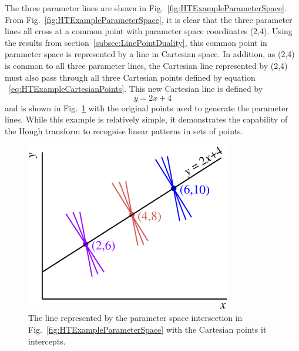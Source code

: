 The three parameter lines are shown in Fig.~\ref{fig:HTExampleParameterSpace}.  From Fig.~\ref{fig:HTExampleParameterSpace}, it is clear that the three parameter lines all cross at a common point with parameter space coordinates (2,4).  Using the results from section~\ref{subsec:LinePointDuality}, this common point in parameter space is represented by a line in Cartesian space.  In addition, as (2,4) is common to all three parameter lines, the Cartesian line represented by (2,4) must also pass through all three Cartesian points defined by equation ~\ref{eq:HTExampleCartesianPoints}.  This new Cartesian line is defined by
\begin{equation}
  y = 2x + 4
  \label{eq:HTExampleCartesianLine}
\end{equation}
and is shown in Fig.~\ref{fig:HTExampleCartesianSpaceWithLine} with the original points used to generate the parameter lines.  While this example is relatively simple, it demonstrates the capability of the Hough transform to recognise linear patterns in sets of points.

\begin{figure}
  \centering
  \includegraphics[width=9cm]{images/hough_transform/HT_example_cartesian_space_with_line}
  \caption{The line represented by the parameter space intersection in Fig.~\ref{fig:HTExampleParameterSpace} with the Cartesian points it intercepts.}
  \label{fig:HTExampleCartesianSpaceWithLine}
\end{figure}


